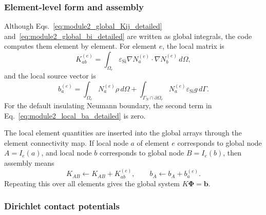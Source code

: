 \documentclass[11pt]{article}
\begin{document}
\subsubsection{Element-level form and assembly}

Although Eqs.~\eqref{eq:module2_global_Kij_detailed} and~\eqref{eq:module2_global_bi_detailed} are written as global integrals, the code computes them element by element. For element $e$, the local matrix is
\begin{equation}
\boxed{
K_{ab}^{(e)}
= \int_{\Omega_e} \varepsilon_{\mathrm{Si}}
\nabla N_a^{(e)} \cdot \nabla N_b^{(e)}
\, d\Omega,
}
\label{eq:module2_local_Kab_detailed}
\end{equation}
and the local source vector is
\begin{equation}
\boxed{
b_a^{(e)}
= \int_{\Omega_e} N_a^{(e)} \rho \, d\Omega
+ \int_{\Gamma_N \cap \partial\Omega_e} N_a^{(e)} \varepsilon_{\mathrm{Si}} g \, d\Gamma .
}
\label{eq:module2_local_ba_detailed}
\end{equation}
For the default insulating Neumann boundary, the second term in Eq.~\eqref{eq:module2_local_ba_detailed} is zero.

The local element quantities are inserted into the global arrays through the element connectivity map. If local node $a$ of element $e$ corresponds to global node $A=I_e(a)$, and local node $b$ corresponds to global node $B=I_e(b)$, then assembly means
\begin{equation}
K_{AB} \leftarrow K_{AB} + K_{ab}^{(e)},
\qquad
b_A \leftarrow b_A + b_a^{(e)}.
\end{equation}
Repeating this over all elements gives the global system $K\bm{\Phi}=\bm{b}$.

\subsubsection{Dirichlet contact potentials}
\end{document}
